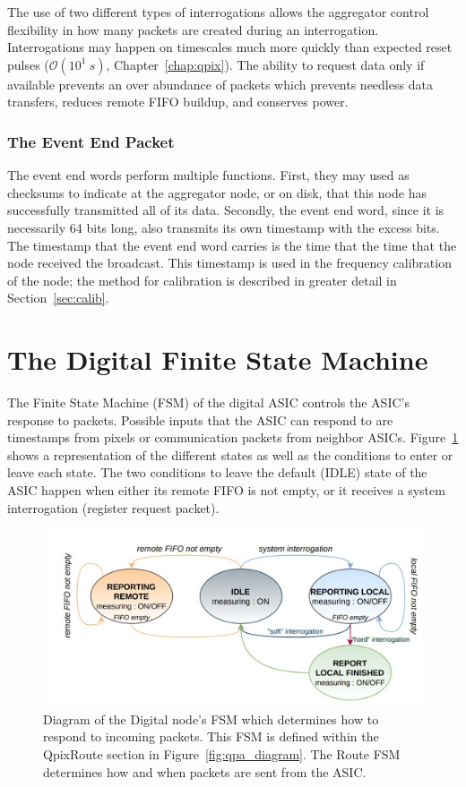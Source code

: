 The use of two different types of interrogations allows the aggregator control flexibility in how many packets are created during an interrogation.
Interrogations may happen on timescales much more quickly than expected reset pulses ($\mathcal{O}(10^{1}~\unit{s})$, Chapter~\ref{chap:qpix}).
The ability to request data only if available prevents an over abundance of packets which prevents needless data transfers, reduces remote FIFO buildup, and conserves power.

\subsubsection{The Event End Packet}
The event end words perform multiple functions.
First, they may used as checksums to indicate at the aggregator node, or on disk, that this node has successfully transmitted all of its data.
Secondly, the event end word, since it is necessarily 64 bits long, also transmits its own timestamp with the excess bits.
The timestamp that the event end word carries is the time that the time that the node received the broadcast.
This timestamp is used in the frequency calibration of the node; the method for calibration is described in greater detail in Section~\ref{sec:calib}.

\section{The Digital Finite State Machine}\label{sec:digital_fsm}
The Finite State Machine (FSM) of the digital ASIC controls the ASIC's response to packets.
Possible inputs that the ASIC can respond to are timestamps from pixels or communication packets from neighbor ASICs.
Figure~\ref{fig:digital_fsm} shows a representation of the different states as well as the conditions to enter or leave each state.
The two conditions to leave the default (IDLE) state of the ASIC happen when either its remote FIFO is not empty, or it receives a system interrogation (register request packet).

\begin{figure}[]
\centering
\includegraphics[width=\textwidth]{images/digital_fsm_overview.jpg}
\caption{Diagram of the Digital node's FSM which determines how to respond to incoming packets.
This FSM is defined within the QpixRoute section in Figure~\ref{fig:qpa_diagram}.
The Route FSM determines how and when packets are sent from the ASIC.
}
\label{fig:digital_fsm}
\end{figure}

